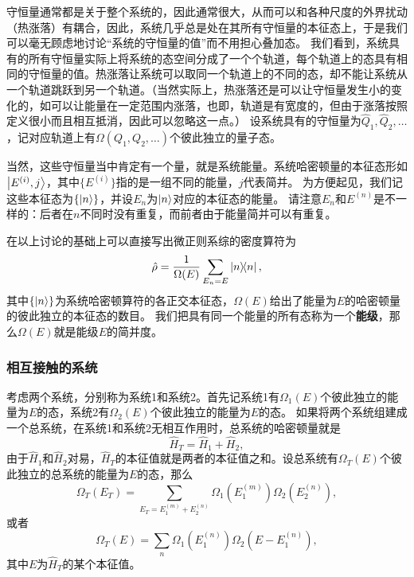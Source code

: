 \documentclass[hyperref, UTF8, a4paper]{ctexart}
\begin{document}
守恒量通常都是关于整个系统的，因此通常很大，从而可以和各种尺度的外界扰动（热涨落）有耦合，因此，系统几乎总是处在其所有守恒量的本征态上，于是我们可以毫无顾虑地讨论“系统的守恒量的值”而不用担心叠加态。
我们看到，系统具有的所有守恒量实际上将系统的态空间分成了一个个轨道，每个轨道上的态具有相同的守恒量的值。热涨落让系统可以取同一个轨道上的不同的态，却不能让系统从一个轨道跳跃到另一个轨道。（当然实际上，热涨落还是可以让守恒量发生小的变化的，如可以让能量在一定范围内涨落，也即，轨道是有宽度的，但由于涨落按照定义很小而且相互抵消，因此可以忽略这一点。）
设系统具有的守恒量为$\hat{Q}_1, \hat{Q}_2, \ldots$，记对应轨道上有$\Omega(Q_1, Q_2, \ldots)$个彼此独立的量子态。

当然，这些守恒量当中肯定有一个量，就是系统能量。系统哈密顿量的本征态形如$\ket{E^{(i)}, j}$，其中$\{E^{(i)}\}$指的是一组不同的能量，$j$代表简并。
为方便起见，我们记这些本征态为$\{\ket{n}\}$，并设$E_n$为$\ket{n}$对应的本征态的能量。
请注意$E_n$和$E^{(n)}$是不一样的：后者在$n$不同时没有重复，而前者由于能量简并可以有重复。

在以上讨论的基础上可以直接写出微正则系综的密度算符为
\begin{equation}
    \hat{\rho} = \frac{1}{\Omega(E)} \sum_{E_n = E} \dyad{n},
    \label{eq:microcanonical-ensemble-density-operator}
\end{equation}
其中$\{\ket{n}\}$为系统哈密顿算符的各正交本征态，$\Omega(E)$给出了能量为$E$的哈密顿量的彼此独立的本征态的数目。
我们把具有同一个能量的所有态称为一个\textbf{能级}，那么$\Omega(E)$就是能级$E$的简并度。

\subsubsection{相互接触的系统}\label{sec:contacting-systems}

考虑两个系统，分别称为系统1和系统2。首先记系统1有$\Omega_1 (E)$个彼此独立的能量为$E$的态，系统2有$\Omega_2 (E)$个彼此独立的能量为$E$的态。
如果将两个系统组建成一个总系统，在系统1和系统2无相互作用时，总系统的哈密顿量就是
\[
    \hat{H}_T = \hat{H}_1 + \hat{H}_2,
\]
由于$\hat{H}_1$和$\hat{H}_2$对易，$\hat{H}_T$的本征值就是两者的本征值之和。设总系统有$\Omega_T(E)$个彼此独立的总系统的能量为$E$的态，那么
\[
    \Omega_T (E_T) = \sum_{E_T=E_1^{(m)}+E_2^{(n)}} \Omega_1 (E_1^{(m)}) \Omega_2 (E_2^{(n)}),
\]
或者
\begin{equation}
    \Omega_T (E) = \sum_{n} \Omega_1 (E_1^{(n)}) \Omega_2 (E - E_1^{(n)}),
    \label{eq:total-system-state-number}
\end{equation}
其中$E$为$\hat{H}_T$的某个本征值。
\end{document}
